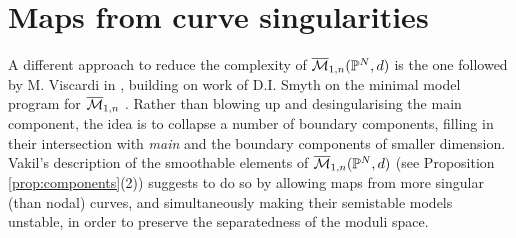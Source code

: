 \section{Maps from curve singularities}\label{sec:singularities}
A different approach to reduce the complexity of $\overline{\mathcal{M}}_{1,n}(\mathbb P^N,d)$ is the one followed by M. Viscardi in \cite{VISC}, building on work of D.I. Smyth on the minimal model program for $\overline{\mathcal{M}}_{1,n}$ \cite{SMY1}. Rather than blowing up and desingularising the main component, the idea is to collapse a number of boundary components, filling in their intersection with \emph{main} and the boundary components of smaller dimension. Vakil's description of the smoothable elements of $\overline{\mathcal{M}}_{1,n}(\mathbb P^N,d)$ (see Proposition \ref{prop:components}(2)) suggests to do so by allowing maps from more singular (than nodal) curves, and simultaneously making their semistable models unstable, in order to preserve the separatedness of the moduli space.

